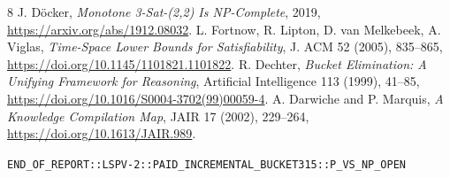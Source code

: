 \documentclass[11pt]{article}
\begin{document}
\begin{thebibliography}{8}
 J. D\"ocker, \emph{Monotone 3-Sat-(2,2) Is NP-Complete}, 2019, \url{https://arxiv.org/abs/1912.08032}.
 L. Fortnow, R. Lipton, D. van Melkebeek, A. Viglas, \emph{Time-Space Lower Bounds for Satisfiability}, J. ACM 52 (2005), 835--865, \url{https://doi.org/10.1145/1101821.1101822}.
 R. Dechter, \emph{Bucket Elimination: A Unifying Framework for Reasoning}, Artificial Intelligence 113 (1999), 41--85, \url{https://doi.org/10.1016/S0004-3702(99)00059-4}.
 A. Darwiche and P. Marquis, \emph{A Knowledge Compilation Map}, JAIR 17 (2002), 229--264, \url{https://doi.org/10.1613/JAIR.989}.
\end{thebibliography}
\noindent\texttt{END\_OF\_REPORT::LSPV-2::PAID\_INCREMENTAL\_BUCKET315::P\_VS\_NP\_OPEN}
\end{document}
